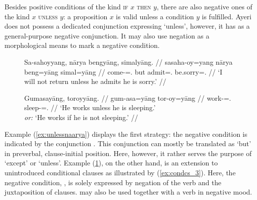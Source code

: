 Besides positive conditions of the kind \textsc{if} $x$ \textsc{then} $y$,
there are also negative ones of the kind $x$ \textsc{unless} $y$: a proposition
$x$ is valid unless a condition $y$ is fulfilled. Ayeri does not possess a
dedicated conjunction expressing `unless', however, it has 
as a general-purpose negative conjunction. It may also use negation as a
morphological means to mark a negative condition.

\begin{figure}[h]
\pex
\a\label{ex:unlessnaarya}\begingl
	\gla Sa-sahoyyang, nārya bengyāng, simalyāng. //
	\glb sa\til{}saha-oy=yang nārya beng=yāng simal=yāng //
	\glc \Iter{}\til{}come-\Neg{}=\TsgM{}.\Aarg{} but admit=\TsgM{}.\Aarg{}
		be.sorry=\TsgM{}.\Aarg{} //
	\glft `I will not return unless he admits he is sorry.' //
\endgl

\a\label{ex:unlessneg}\begingl
	\gla Gumasayāng, toroyyāng. //
	\glb gum-asa=yāng tor-oy=yāng //
	\glc work-\Hab{}=\TsgM{}.\Aarg{} sleep-\Neg{}=\TsgM{}.\Aarg{} //
	\glft `He works unless he is sleeping.'\\
		\textit{or:} `He works if he is not sleeping.' //
\endgl
\xe
\end{figure}

Example (\ref{ex:unlessnaarya}) displays the first strategy: the negative
condition is indicated by the conjunction . This conjunction
can mostly be translated as `but' in preverbal, clause-initial position. Here,
however, it rather serves the purpose of `except' or `unless'. Example
(\ref{ex:unlessneg}), on the other hand, is an extension to unintroduced
conditional clauses as illustrated by (\ref{ex:condcs_3}). Here, the negative
condition, , is solely
expressed by negation of the verb 
and the juxtaposition of clauses.  may also be used together
with a verb in negative mood.

